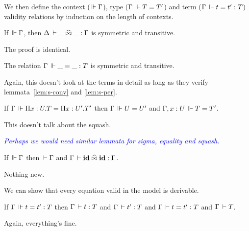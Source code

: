 \documentclass[a4paper,english]{lipics-utf8x}
\newcommand\meta[1]{\noindent\textcolor{blue}{\emph{#1}}}
\begin{document}
  We then define the context ($\,\Vdash \Gamma$), type ($\Gamma \,\Vdash T = T'$) and
  term ($\Gamma \,\Vdash t = t' : T$) validity relations by induction on the length
  of contexts.

  \begin{mathc}
    \ru{}{\Der \cdot}
    \qquad
    \qquad
    \qquad
  \end{mathc}

  \begin{mathc}
    \qquad
  \end{mathc}

  \begin{lemma}
    If $\,\Vdash \Gamma$, then $\Delta \,\vdash \_ \mathrel{\widehat{\bowtie}} \_ : \Gamma$ is symmetric and
    transitive.
  \end{lemma}
  The proof is identical.

  \begin{lemma}
    The relation $\Gamma \,\Vdash \_ = \_ : T$ is symmetric and transitive.
  \end{lemma}
  Again, this doesn't look at the terms in detail as long as they verify
  lemmata~\ref{lem:s-conv} and \ref{lem:s-per}.

  \begin{lemma}
    \label{lem:fun-inj-valid}
    If $\Gamma \,\Vdash \Pi x:U.T = \Pi x:U'.T'$ then $\Gamma \,\Vdash U = U'$ and
    $\Gamma, x:U \,\Vdash T = T'$.
  \end{lemma}
  This doesn't talk about the squash.

  \meta{Perhaps we would need similar lemmata for sigma, equality and squash.}

  \begin{lemma}
    If $\,\Vdash \Gamma$ then $\,\vdash \Gamma$ and $\Gamma \,\vdash \operatorname{\mathbf{id}} \mathrel{\widehat{\bowtie}} \operatorname{\mathbf{id}} : \Gamma$.
  \end{lemma}
  Nothing new.

  We can show that every equation valid in the model is derivable.
  \begin{lemma}
    If $\Gamma \,\Vdash t = t' : T$ then $\Gamma \,\vdash t : T$ and
    $\Gamma \,\vdash t' : T$ and $\Gamma \,\vdash t = t' : T$ and $\Gamma \,\vdash T$.
  \end{lemma}
  Again, everything's fine.
\end{document}
